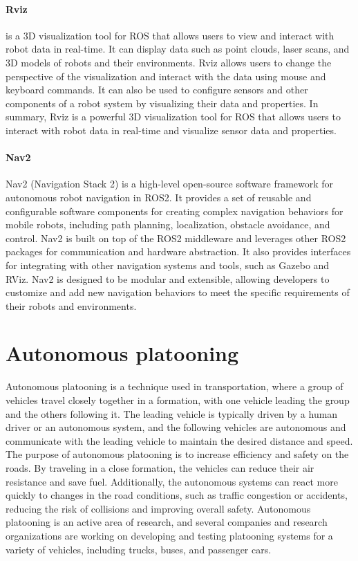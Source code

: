 \paragraph{Rviz} is a 3D visualization tool for ROS that allows users to view and interact with robot data in real-time. It can display data such as point clouds, laser scans, and 3D models of robots and their environments. Rviz allows users to change the perspective of the visualization and interact with the data using mouse and keyboard commands. It can also be used to configure sensors and other components of a robot system by visualizing their data and properties. In summary, Rviz is a powerful 3D visualization tool for ROS that allows users to interact with robot data in real-time and visualize sensor data and properties.

\paragraph{Nav2}
Nav2 (Navigation Stack 2) is a high-level open-source software framework for autonomous robot navigation in ROS2. It provides a set of reusable and configurable software components for creating complex navigation behaviors for mobile robots, including path planning, localization, obstacle avoidance, and control. Nav2 is built on top of the ROS2 middleware and leverages other ROS2 packages for communication and hardware abstraction. It also provides interfaces for integrating with other navigation systems and tools, such as Gazebo and RViz. Nav2 is designed to be modular and extensible, allowing developers to customize and add new navigation behaviors to meet the specific requirements of their robots and environments.

\section{Autonomous platooning}

Autonomous platooning is a technique used in transportation, where a group of vehicles travel closely together in a formation, with one vehicle leading the group and the others following it. The leading vehicle is typically driven by a human driver or an autonomous system, and the following vehicles are autonomous and communicate with the leading vehicle to maintain the desired distance and speed. The purpose of autonomous platooning is to increase efficiency and safety on the roads. By traveling in a close formation, the vehicles can reduce their air resistance and save fuel. Additionally, the autonomous systems can react more quickly to changes in the road conditions, such as traffic congestion or accidents, reducing the risk of collisions and improving overall safety. Autonomous platooning is an active area of research, and several companies and research organizations are working on developing and testing platooning systems for a variety of vehicles, including trucks, buses, and passenger cars. 